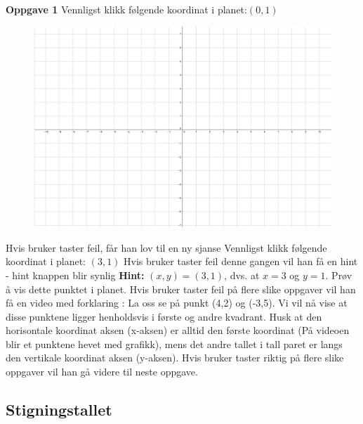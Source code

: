 \documentclass[12pt,twoside,onecolumn]{article}
\begin{document}
\textbf{Oppgave 1}
Vennligst klikk følgende koordinat i planet:$(0,1)$
\begin{figure}[h!]
\includegraphics[scale = 0.3]{figures/Grid.png}
\label{fig:grid}
\end{figure}
\newline
{\color{Maroon}Hvis bruker taster feil, får han lov til en ny sjanse}
\newline
Vennligst klikk følgende koordinat i planet: $(3,1)$
\newline
{\color{Maroon}Hvis bruker taster feil denne gangen vil han få en hint - hint knappen blir synlig}
\newline\newline
\textbf{Hint:}  $(x,y) = (3,1)$, dvs. at $x = 3$ og $y = 1$. Prøv å vis dette punktet i planet.
\newline
\newline
{\color{Maroon}Hvis bruker taster feil på flere slike oppgaver vil han få en video med forklaring :} 
\newline
La oss se på punkt (4,2) og (-3,5). Vi vil nå vise at disse punktene ligger henholdsvis i første og andre kvadrant.
Husk at den horisontale koordinat aksen (x-aksen) er alltid den første koordinat ({\color{PineGreen}På videoen blir et punktene hevet med grafikk}), mens det andre tallet i tall paret er langs den vertikale koordinat aksen (y-aksen).
\newline
\newline
{\color{Maroon}Hvis bruker taster riktig på flere slike oppgaver vil han gå videre til neste oppgave.}

\subsection*{Stigningstallet}
\end{document}
